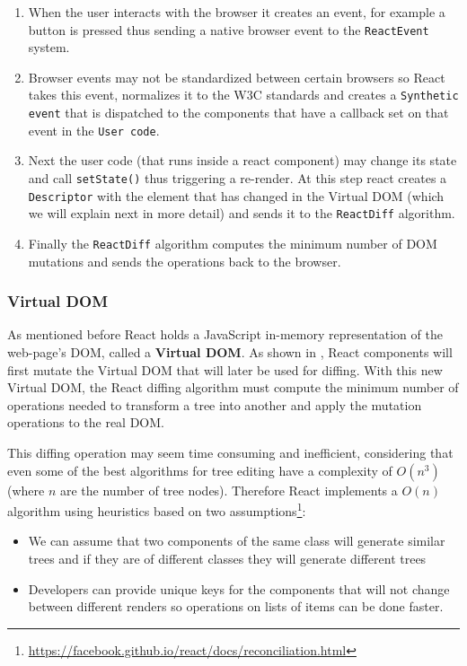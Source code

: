 \begin{enumerate}
	\item When the user interacts with the browser it creates an event, for example a button is pressed thus sending a native browser event to the \texttt{ReactEvent} system.
	\item  Browser events may not be standardized between certain browsers so React takes this event, normalizes it to the W3C standards and creates a \texttt{Synthetic event} that is dispatched to the components that have a callback set on that event in the \texttt{User code}.
	\item Next the user code (that runs inside a react component) may change its state and call \texttt{setState()} thus triggering a re-render. At this step react creates a \texttt{Descriptor} with the element that has changed in the Virtual DOM (which we will explain next in more detail) and sends it to the \texttt{ReactDiff} algorithm.
	\item Finally the \texttt{ReactDiff} algorithm computes the minimum number of DOM mutations and sends the operations back to the browser.
\end{enumerate}


\subsubsection{Virtual DOM}
\label{sub-sub-sec:virtual-dom}

As mentioned before React holds a JavaScript in-memory representation of the web-page's DOM, called a \textbf{Virtual DOM}. As shown in , React components will first mutate the Virtual DOM that will later be used for diffing. With this new Virtual DOM, the React diffing algorithm must compute the minimum number of operations needed to transform a tree into another and apply the mutation operations to the real DOM.


This diffing operation may seem time consuming and inefficient, considering that even some of the best algorithms for tree editing have a complexity of $O(n^3)$\cite{trees} (where $n$ are the number of tree nodes). Therefore React implements a $O(n)$ algorithm using heuristics based on two assumptions\footnote{\url{https://facebook.github.io/react/docs/reconciliation.html}}:

\begin{itemize}
	\item We can assume that two components of the same class will generate similar trees and if they are of different classes they will generate different trees
	\item Developers can provide unique keys for the components that will not change between different renders so operations on lists of items can be done faster.
\end{itemize}




